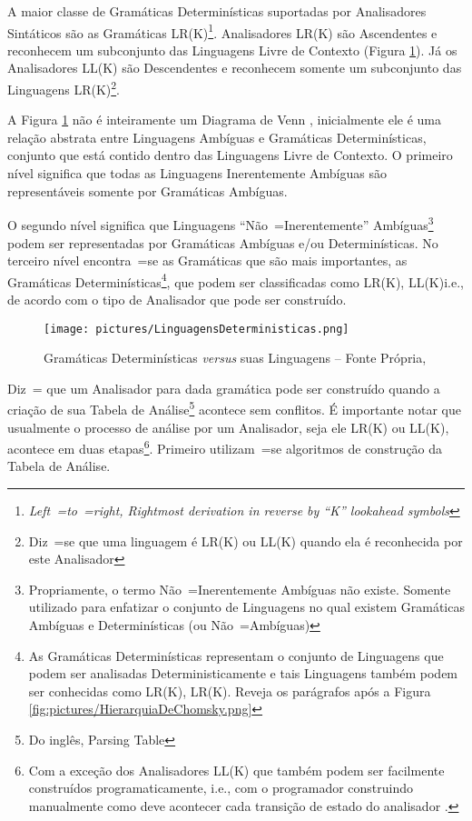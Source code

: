 {    A maior classe de Gramáticas Determinísticas suportadas por Analisadores
    Sintáticos são as Gramáticas LR(K)\footnote{\textit{Left~=to~=right,
    Rightmost derivation in reverse by ``K'' lookahead symbols
    }}.
    Analisadores LR(K) \cite{ahoCompilerDragonBook} são Ascendentes e
    reconhecem um subconjunto das Linguagens Livre de Contexto (Figura \ref{fig:pictures/LinguagensDeterministicas.png}).
    Já os Analisadores LL(K) são Descendentes \cite{antlrBookTerrentParr} e
    reconhecem somente um subconjunto das Linguagens LR(K)\footnote{Diz~=se que uma linguagem é LR(K) ou
    LL(K) quando ela é reconhecida por este Analisador}.

    A Figura \ref{fig:pictures/LinguagensDeterministicas.png} não é inteiramente um Diagrama de Venn \cite{generalizedVennDiagrams},
    inicialmente ele é uma relação abstrata entre Linguagens Ambíguas e
    Gramáticas Determinísticas,
    conjunto que está contido dentro das Linguagens Livre de Contexto.
    O primeiro nível significa que todas as Linguagens Inerentemente Ambíguas são representáveis somente por Gramáticas Ambíguas.

    O segundo nível significa que Linguagens ``Não~=Inerentemente'' Ambíguas\footnote{Propriamente,
    o termo Não~=Inerentemente Ambíguas não existe.
    Somente utilizado para enfatizar o conjunto de Linguagens no qual existem Gramáticas Ambíguas e
    Determinísticas (ou Não~=Ambíguas)} podem ser representadas por Gramáticas Ambíguas e\slash{}ou Determinísticas.
    No terceiro nível encontra~=se as Gramáticas que são mais importantes,
    as Gramáticas Determinísticas\footnote{As Gramáticas Determinísticas representam o conjunto de Linguagens que podem ser analisadas Deterministicamente e
    tais Linguagens também podem ser conhecidas como LR(K),
    LR(K).
    Reveja os parágrafos após a Figura \ref{fig:pictures/HierarquiaDeChomsky.png}
    },
    que podem ser classificadas como LR(K),
    LL(K)i.e.,
    de acordo com o tipo de Analisador que pode ser construído.
    \begin{figure}[h]
    \centering
    \texttt{[image: pictures/LinguagensDeterministicas.png]}
    \caption{Gramáticas Determinísticas \textit{versus} suas Linguagens -- Fonte Própria,
    }
    \label{fig:pictures/LinguagensDeterministicas.png}
    \end{figure}

    Diz~= que um Analisador para dada gramática pode ser construído quando a criação de sua Tabela de Análise\footnote{Do inglês,
    Parsing Table} \cite{ahoCompilerDragonBook} acontece sem conflitos.
    É importante notar que usualmente o processo de análise por um Analisador,
    seja ele LR(K) ou
    LL(K),
    acontece em duas etapas\footnote{
    Com a exceção dos Analisadores LL(K) que também podem ser facilmente construídos programaticamente,
    i.e.,
    com o programador construindo manualmente como deve acontecer cada transição de estado do analisador \cite{ahoCompilerDragonBook}.
    }.
    Primeiro utilizam~=se algoritmos de construção da Tabela de Análise.

}
